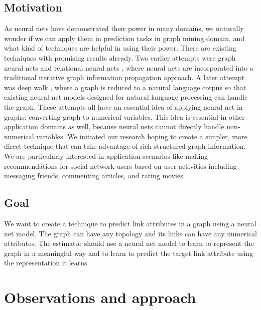 \documentclass{article}
\begin{document}
\subsection{Motivation}
As neural nets have demonstrated their power in many domains, we naturally 
wonder if we can apply them in prediction tasks in graph mining domain, and 
what kind of techniques are helpful in using their power.
There are existing techniques with promising results already.
Two earlier attempts were graph neural nets and relational neural 
nets \cite{scarselli2009graph}, where neural nets are incorporated into a 
traditional iterative graph information propagation approach.
A later attempt was deep walk \cite{perozzi2014deepwalk}, where a graph is 
reduced to a natural language corpus so that existing neural net models 
designed for natural language processing can handle the graph.
These attempts all have an essential idea of applying neural net in 
graphs: converting graph to numerical variables.
This idea is essential in other application domains as well, because neural 
nets cannot directly handle non-numerical variables.
We initiated our research hoping to create a simpler, more direct technique 
that can take advantage of rich structured graph information.
We are particularly interested in application scenarios like making 
recommendations for social network users based on user activities including 
messaging friends, commenting articles, and rating movies.

\subsection{Goal}
We want to create a technique to predict link attributes in a graph using a 
neural net model.
The graph can have any topology and its links can have any numerical attributes.
The estimator should use a neural net model to learn to represent the graph in 
a meaningful way and to learn to predict the target link attribute using the 
representation it learns.

\section{Observations and approach}
\end{document}
